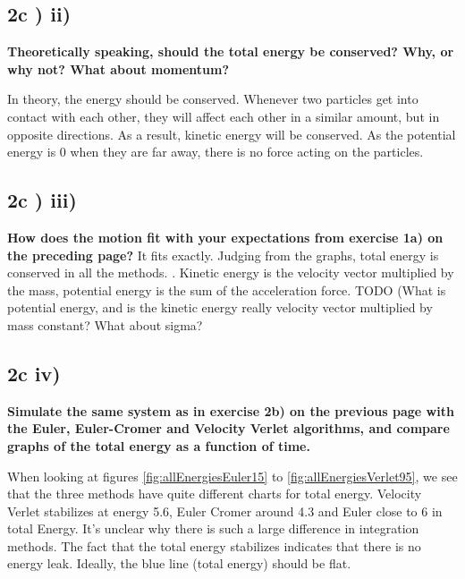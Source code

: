 \subsection*{2c ) ii)}
\textbf{Theoretically speaking, should the total energy be conserved? Why, or why not? What about
momentum?
}

In theory, the energy should be conserved. Whenever two particles get into contact with each other, they will affect each other in a similar amount, but in opposite directions. As a result, kinetic energy will be conserved. As the potential energy is 0 when they are far away, there is no force acting on the particles.


\subsection*{2c ) iii)}
\textbf{How does the motion fit with your expectations from exercise 1a) on the preceding page?}
It fits exactly. Judging from the graphs, total energy is conserved in all the methods. . Kinetic energy is the velocity vector multiplied by the mass, potential energy is the sum of the acceleration force. TODO (What is potential energy, and is the kinetic energy really velocity vector multiplied by mass constant? What about sigma?


\subsection*{2c iv)}
\textbf{Simulate the same system as in exercise 2b) on the previous page with the Euler, Euler-Cromer
and Velocity Verlet algorithms, and compare graphs of the total energy as a function of time.}


When looking at figures \ref{fig:allEnergiesEuler15} to \ref{fig:allEnergiesVerlet95}, we see that the three methods have quite different charts for total energy. Velocity Verlet stabilizes at energy 5.6, Euler Cromer around 4.3 and Euler close to 6 in total Energy. It's unclear why there is such a large difference in integration methods. The fact that the total energy stabilizes indicates that there is no energy leak. Ideally, the blue line (total energy) should be flat.


